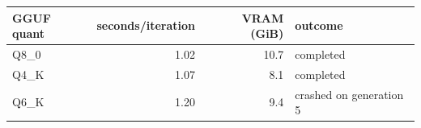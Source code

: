 \begin{tabular}{@{}lrrl@{}}
\toprule
GGUF quant & seconds/iteration & VRAM (GiB) & outcome \\
\midrule
Q8\_0 & 1.02 & 10.7 & completed \\
Q4\_K & 1.07 & 8.1 & completed \\
Q6\_K & 1.20 & 9.4 & crashed on generation 5 \\
\bottomrule
\end{tabular}
